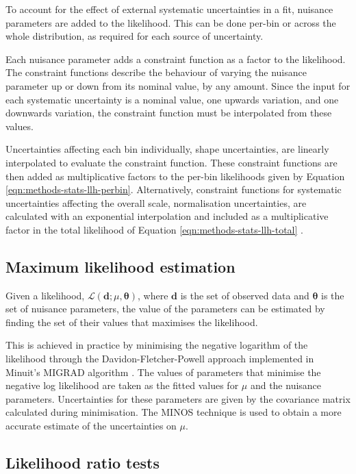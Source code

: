 To account for the effect of external systematic uncertainties in a fit,
nuisance parameters are added to the likelihood. This can be done per-bin or
across the whole distribution, as required for each source of uncertainty.

Each nuisance parameter adds a constraint function as a factor to the
likelihood. The constraint functions describe the behaviour of varying the
nuisance parameter up or down from its nominal value, by any amount. Since the
input for each systematic uncertainty is a nominal value, one upwards variation,
and one downwards variation, the constraint function must be interpolated from
these values.

Uncertainties affecting each bin individually, shape uncertainties, are linearly
interpolated to evaluate the constraint function. These constraint functions are
then added as multiplicative factors to the per-bin likelihoods given by
Equation \ref{eqn:methods-stats-llh-perbin}. Alternatively, constraint functions
for systematic uncertainties affecting the overall scale, normalisation
uncertainties, are calculated with an exponential interpolation and included as
a multiplicative factor in the total likelihood of Equation
\ref{eqn:methods-stats-llh-total} \cite{Cranmer2012}.

\subsection{Maximum likelihood estimation}

\newcommand\dvec{\ensuremath{\mathbf{d}}\xspace}
\newcommand\thetavec{\ensuremath{\boldsymbol{\theta}}\xspace}
Given a likelihood, $\mathcal{L}(\dvec;\mu,\thetavec)$, where \dvec is the set
of observed data and \thetavec is the set of nuisance parameters, the value of
the parameters can be estimated by finding the set of their values that
maximises the likelihood.

This is achieved in practice by minimising the negative logarithm of the
likelihood through the Davidon-Fletcher-Powell approach
\cite{Davidon1959,Fletcher1970,Powell1983} implemented in Minuit's MIGRAD
algorithm \cite{Minuit2}.  The values of parameters that minimise the negative
log likelihood are taken as the fitted values for $\mu$ and the nuisance
parameters. Uncertainties for these parameters are given by the covariance
matrix calculated during minimisation. The MINOS technique \cite{Minuit2} is
used to obtain a more accurate estimate of the uncertainties on $\mu$.

\subsection{Likelihood ratio tests}

